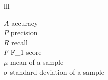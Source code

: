 \documentclass[
11pt, %
oneside, %
english, %
singlespacing, %
headsepline, %
]{MastersDoctoralThesis} %
\begin{document}






\begin{symbols}{lll} %

$A$ accuracy \\
$P$ precision \\ 
$R$ recall \\
$F$ F\_1 score \\
$\mu$ mean of a sample \\ 
$\sigma$ standard deviation of a sample \\



\end{symbols}


\end{document}
